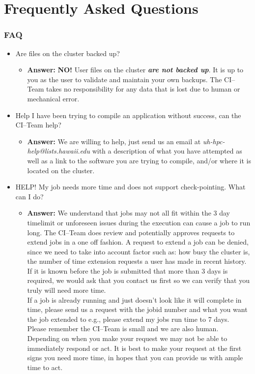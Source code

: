 \documentclass[t,hyperref={pdfpagelabels=false}]{beamer}
\newcommand{\citeam}{CI--Team}
\begin{document}
\section{Frequently Asked Questions}
\begin{frame}
\frametitle{FAQ}
\begin{itemize}\footnotesize
\item Are files on the cluster backed up?
  \begin{itemize}\tiny
  \item \textbf{Answer:} \textbf{NO!}  User files on the cluster \textbf{\emph{are not backed up}}.  It is up to you as the user to validate and maintain your own backups.  The {\citeam} takes no responsibility for any data that is lost due to human or mechanical error.  
  \end{itemize}

\item Help I have been trying to compile an application without success, can the {\citeam} help?
  \begin{itemize}\tiny
  \item \textbf{Answer:} We are willing to help, just send us an email at \textit{uh-hpc-help@lists.hawaii.edu} with a description of what you have attempted as well as a link to the software you are trying to compile, and/or where it is located on the cluster.
  \end{itemize}
  
\item HELP! My job needs more time and does not support check-pointing.  What can I do?
  \begin{itemize}\tiny
  \item \textbf{Answer:} We understand that jobs may not all fit within the 3 day timelimit or unforeseen issues during the execution can cause a job to run long.  The {\citeam} does review and potentially approves requests to extend jobs in a one off fashion.  A request to extend a job can be denied, since we need to take into account factor such as: how busy the cluster is, the number of time extension requests a user has made in recent history.\\If it is known before the job is submitted that more than 3 days is required, we would ask that you contact us first so we can verify that you truly will need more time.\\If a job is already running and just doesn't look like it will complete in time, please send us a request with the jobid number and what you want the job extended to e.g., please extend my jobs run time to 7 days.\\Please remember the {\citeam} is small and we are also human.  Depending on when you make your request we may not be able to immediately respond or act.  It is best to make your request at the first signs you need more time, in hopes that you can provide us with ample time to act.
  \end{itemize}

\end{itemize}

\end{frame}
\end{document}

